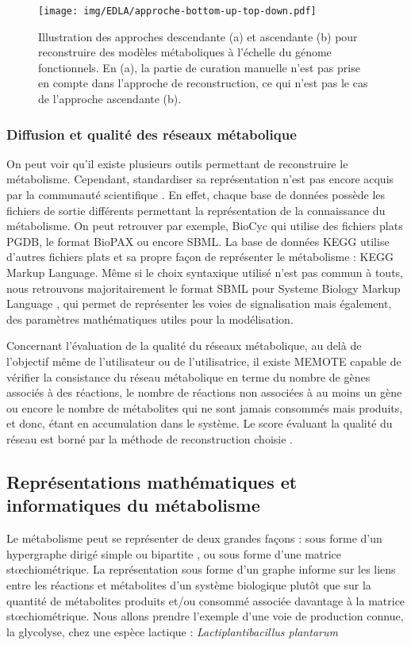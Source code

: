 \documentclass[../main.tex]{subfiles}
\begin{document}
\begin{figure}[H]
    \centering
    \texttt{[image: img/EDLA/approche-bottom-up-top-down.pdf]}
    \caption{Illustration des approches descendante (a) et ascendante (b) pour reconstruire des modèles métaboliques à l'échelle du génome fonctionnels. En (a), la partie de curation manuelle n'est pas prise en compte dans l'approche de reconstruction, ce qui n'est pas le cas de l'approche ascendante (b).  }
    \label{fig:approche-reconstruction}
\end{figure}



\subsubsection*{Diffusion et qualité des réseaux métabolique}
On peut voir qu'il existe plusieurs outils permettant de reconstruire le métabolisme. Cependant, standardiser sa représentation n'est pas encore acquis par la communauté scientifique \citep{Stobbe2014}. En effet, chaque base de données possède les fichiers de sortie différents permettant la représentation de la connaissance du métabolisme. On peut retrouver par exemple, BioCyc \citep{Karp2018} qui utilise des fichiers plats PGDB, le format BioPAX \citep{Demir2010} ou encore SBML\citep{Hucka2019}. La base de données KEGG \citep{Kanehisa} utilise d'autres fichiers plats et sa propre façon de représenter le métabolisme : KEGG Markup Language. Même si le choix syntaxique utilisé n'est pas commun à touts, nous retrouvons majoritairement le format SBML pour Systeme Biology Markup Language \citep{Hucka2019}, qui permet de représenter les voies de signalisation mais également, des paramètres mathématiques utiles pour la modélisation.

Concernant l'évaluation de la qualité du réseaux métabolique, au delà de l'objectif même de l'utilisateur ou de l'utilisatrice, il existe MEMOTE \citep{Lieven.2020} capable de vérifier la consistance du réseau métabolique en terme du nombre de gènes associés à des réactions, le nombre de réactions non associées à au moins un gène ou encore le nombre de métabolites qui ne sont jamais consommés mais produits, et donc, étant en accumulation dans le système. Le score évaluant la qualité du réseau est borné par la méthode de reconstruction choisie \citep{Lieven.2020}.


\subsection{Représentations mathématiques et informatiques du métabolisme}
Le métabolisme peut se représenter de deux grandes façons : sous forme d'un hypergraphe dirigé simple ou bipartite \citep{Belcour.2020}, ou sous forme d'une matrice st\oe{}chiométrique. La représentation sous forme d'un graphe informe sur les liens entre les réactions et métabolites d'un système biologique plutôt que sur la quantité de métabolites produits et/ou consommé associée davantage à la matrice st\oe{}chiométrique. Nous allons prendre l'exemple d'une voie de production connue, la glycolyse, chez une espèce lactique : \textit{Lactiplantibacillus plantarum}\\
\end{document}
